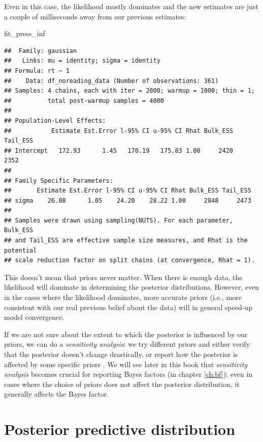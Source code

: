 \documentclass[12pt,]{krantz}
\newenvironment{Shaded}{\begin{snugshade}}{\end{snugshade}}
\newcommand{\NormalTok}[1]{#1}
\theoremstyle{definition}
\theoremstyle{definition}
\theoremstyle{definition}
\theoremstyle{remark}
\begin{document}
Even in this case, the likelihood mostly dominates and the new estimates
are just a couple of milliseconds away from our previous estimates:

\begin{Shaded}
\begin{Highlighting}[]
\NormalTok{fit_press_inf}
\end{Highlighting}
\end{Shaded}

\begin{verbatim}
##  Family: gaussian 
##   Links: mu = identity; sigma = identity 
## Formula: rt ~ 1 
##    Data: df_noreading_data (Number of observations: 361) 
## Samples: 4 chains, each with iter = 2000; warmup = 1000; thin = 1;
##          total post-warmup samples = 4000
## 
## Population-Level Effects: 
##           Estimate Est.Error l-95% CI u-95% CI Rhat Bulk_ESS Tail_ESS
## Intercept   172.93      1.45   170.19   175.83 1.00     2420     2352
## 
## Family Specific Parameters: 
##       Estimate Est.Error l-95% CI u-95% CI Rhat Bulk_ESS Tail_ESS
## sigma    26.08      1.05    24.20    28.22 1.00     2848     2473
## 
## Samples were drawn using sampling(NUTS). For each parameter, Bulk_ESS
## and Tail_ESS are effective sample size measures, and Rhat is the potential
## scale reduction factor on split chains (at convergence, Rhat = 1).
\end{verbatim}

This doesn't mean that priors never matter. When there is enough data,
the likelihood will dominate in determining the posterior distributions.
However, even in the cases where the likelihood dominates, more accurate
priors (i.e., more consistent with our real previous belief about the
data) will in general speed-up model convergence.

If we are not sure about the extent to which the posterior is influenced
by our priors, we can do a \emph{sensitivity analysis}: we try different
priors and either verify that the posterior doesn't change drastically,
or report how the posterior is affected by some specific priors
\citep[for a published example in psycholinguistics,
see][]{vasishthProcessingChineseRelative2013}. We will see later in this
book that \emph{sensitivity analysis} becomes crucial for reporting
Bayes factors (in chapter \ref{ch:bf}); even in cases where the choice
of priors does not affect the posterior distribution, it generally
affects the Bayes factor.

\section{Posterior predictive distribution}\label{sec:ppd}
\end{document}
